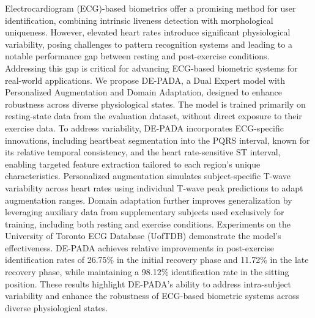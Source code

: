 Electrocardiogram (ECG)-based biometrics offer a promising method for user identification, combining intrinsic liveness detection with morphological uniqueness. However, elevated heart rates introduce significant physiological variability, posing challenges to pattern recognition systems and leading to a notable performance gap between resting and post-exercise conditions. Addressing this gap is critical for advancing ECG-based biometric systems for real-world applications.
We propose DE-PADA, a Dual Expert model with Personalized Augmentation and Domain Adaptation, designed to enhance robustness across diverse physiological states. The model is trained primarily on resting-state data from the evaluation dataset, without direct exposure to their exercise data. To address variability, DE-PADA incorporates ECG-specific innovations, including heartbeat segmentation into the PQRS interval, known for its relative temporal consistency, and the heart rate-sensitive ST interval, enabling targeted feature extraction tailored to each region's unique characteristics. Personalized augmentation simulates subject-specific T-wave variability across heart rates using individual T-wave peak predictions to adapt augmentation ranges. Domain adaptation further improves generalization by leveraging auxiliary data from supplementary subjects used exclusively for training, including both resting and exercise conditions.
Experiments on the University of Toronto ECG Database (UofTDB) demonstrate the model’s effectiveness.
DE-PADA achieves relative improvements in post-exercise identification rates of 26.75\% in the initial recovery phase and 11.72\% in the late recovery phase, while maintaining a 98.12\% identification rate in the sitting position.
These results highlight DE-PADA’s ability to address intra-subject variability and enhance the robustness of ECG-based biometric systems across diverse physiological states.